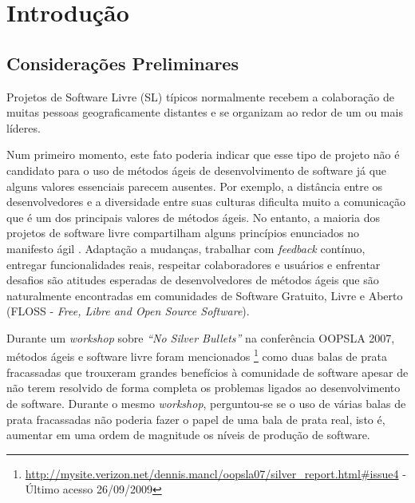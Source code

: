 \chapter{Introdução}
\label{cap:introducao}

\section{Considerações Preliminares}
\label{sec:consideracoes_preliminares}

Projetos de Software Livre (SL) típicos normalmente recebem a
colaboração de muitas pessoas geograficamente distantes
\cite{Dempsey1999} e se organizam ao redor de um ou mais líderes.

Num primeiro momento, este fato poderia indicar que esse tipo de
projeto não é candidato para o uso de métodos ágeis de desenvolvimento
de software já que alguns valores essenciais parecem ausentes. Por
exemplo, a distância entre os desenvolvedores e a diversidade entre
suas culturas dificulta muito a comunicação que é um dos principais
valores de métodos ágeis. No entanto, a maioria dos projetos de
software livre compartilham alguns princípios enunciados no manifesto
ágil \cite{AgileManifesto}. Adaptação a mudanças, trabalhar com
\emph{feedback} contínuo, entregar funcionalidades reais, respeitar
colaboradores e usuários e enfrentar desafios são atitudes esperadas
de desenvolvedores de métodos ágeis que são naturalmente encontradas
em comunidades de Software Gratuito, Livre e Aberto (FLOSS -
\emph{Free, Libre and Open Source Software}).

Durante um \emph{workshop} \cite{OOPSLA07} sobre \emph{``No Silver
  Bullets''} \cite{Brooks1987} na conferência OOPSLA 2007, métodos
ágeis e software livre foram mencionados
\footnote{\url{http://mysite.verizon.net/dennis.mancl/oopsla07/silver_report.html\#issue4}
 - Último acesso 26/09/2009}
 como duas balas de prata fracassadas que
trouxeram grandes benefícios à comunidade de software apesar de não
terem resolvido de forma completa os problemas ligados ao
desenvolvimento de software. Durante o mesmo \emph{workshop},
perguntou-se se o uso de várias balas de prata fracassadas não poderia
fazer o papel de uma bala de prata real, isto é, aumentar em uma ordem
de magnitude os níveis de produção de software.

